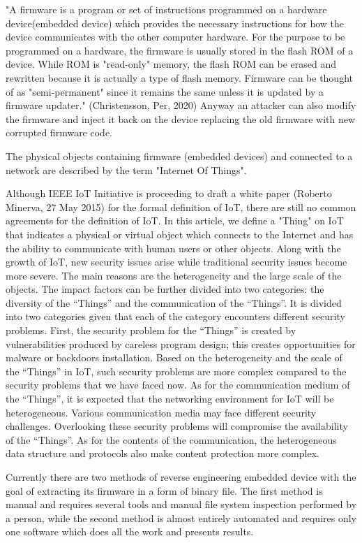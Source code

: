 \documentclass[]{report}
\begin{document}
"A firmware is a program or set of instructions programmed on a hardware device(embedded device) which provides the necessary instructions for how the device communicates with the other computer hardware. For the purpose to be programmed on a hardware, the firmware is usually stored in the flash ROM of a device. While ROM is "read-only" memory, the flash ROM can be erased and rewritten because it is actually a type of flash memory. Firmware can be thought of as "semi-permanent" since it remains the same unless it is updated by a firmware updater." (Christensson, Per, 2020) Anyway an attacker can also modify the firmware and inject it back on the device replacing the old firmware with new corrupted firmware code.

The physical objects containing firmware (embedded devices) and connected to a network are described by the term "Internet Of Things".

Although IEEE IoT Initiative is proceeding to draft a white
paper (Roberto Minerva, 27 May 2015) for the formal definition of IoT, there are still no
common agreements for the definition of IoT. In this article,
we define a "Thing" on IoT that indicates a physical or
virtual object which connects to the Internet and has the
ability to communicate with human users or other objects.
Along with the growth of IoT, new security issues arise
while traditional security issues become more severe. The
main reasons are the heterogeneity and the large scale of the
objects. The impact factors can be further divided into two
categories: the diversity of the “Things” and the
communication of the “Things”. It is divided into two
categories given that each of the category encounters
different security problems.
First, the security problem for the “Things” is created by
vulnerabilities produced by careless program design; this
creates opportunities for malware or backdoors installation.
Based on the heterogeneity and the scale of the “Things” in
IoT, such security problems are more complex compared to
the security problems that we have faced now.
As for the communication medium of the “Things”, it is
expected that the networking environment for IoT will be
heterogeneous. Various communication media may face
different security challenges. Overlooking these security
problems will compromise the availability of the “Things”.
As for the contents of the communication, the heterogeneous
data structure and protocols also make content protection more complex.

Currently there are two methods of reverse engineering embedded device with the goal of extracting its firmware in a form of binary file. The first method is manual and requires several tools and manual file system inspection performed by a person, while the second method is almost entirely automated and requires only one software which does all the work and presents results.
\end{document}

